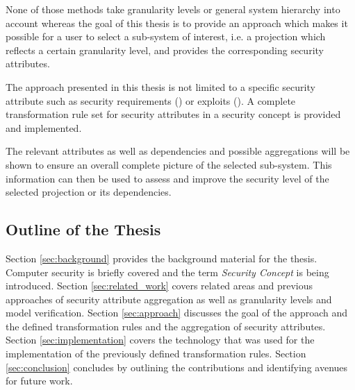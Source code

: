 None of those methods take granularity levels or general system hierarchy into account whereas the goal of this thesis is to provide an approach which makes it possible for a user to select a sub-system of interest, i.e. a projection which reflects a certain granularity level, and provides the corresponding security attributes.

The approach presented in this thesis is not limited to a specific security attribute such as security requirements (\cite{Menzel2008}) or exploits (\cite{Noel:2004:MAG:1029208.1029225}). A complete transformation rule set for security attributes in a security concept is provided and implemented.

The relevant attributes as well as dependencies and possible aggregations will be shown to ensure an overall complete picture of the selected sub-system. This information can then be used to assess and improve the security level of the selected projection or its dependencies.

\subsection{Outline of the Thesis}

Section \ref{sec:background} provides the background material for the thesis. Computer security is briefly covered and the term \textit{Security Concept} is being introduced. Section \ref{sec:related_work} covers related areas and previous approaches of security attribute aggregation as well as granularity levels and model verification. Section \ref{sec:approach} discusses the goal of the approach and the defined transformation rules and the aggregation of security attributes. Section \ref{sec:implementation} covers the technology that was used for the implementation of the previously defined transformation rules. Section \ref{sec:conclusion} concludes by outlining the contributions and identifying avenues for future work. 